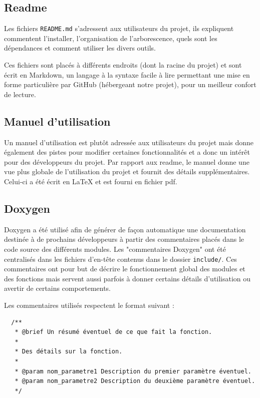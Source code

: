 \documentclass[a4paper,12pt]{article}
\begin{document}
\subsection{Readme}

Les fichiers \verb!README.md! s'adressent aux utilisateurs du projet, ils
expliquent commentent l'installer, l'organisation de l'arborescence, quels
sont les dépendances et comment utiliser les divers outils.

Ces fichiers sont placés à différents endroits (dont la racine du projet) et
sont écrit en Markdown, un langage à la syntaxe facile à lire permettant
une mise en forme particulière par GitHub (hébergeant notre projet), pour un
meilleur confort de lecture.

\subsection{Manuel d'utilisation}

Un manuel d'utilisation est plutôt adressée aux utilisateurs du projet mais
donne également des pistes pour modifier certaines fonctionnalités et a donc
un intérêt pour des développeurs du projet.
Par rapport aux readme, le manuel donne une vue plus globale de l'utilisation
du projet et fournit des détails supplémentaires. Celui-ci a été écrit en
\LaTeX{} et est fourni en fichier pdf.

\subsection{Doxygen}

Doxygen a été utilisé afin de générer de façon automatique une documentation
destinée à de prochains développeurs à partir des commentaires placés dans le
code source des différents modules. Les "commentaires Doxygen" ont été
centralisés dans les fichiers d'en-tête contenus dans le dossier
\verb!include/!. Ces commentaires ont pour but de décrire le fonctionnement
global des modules et des fonctions mais servent aussi parfois à donner
certains détails d'utilisation ou avertir de certains comportements.

Les commentaires utilisés respectent le format suivant :
\begin{verbatim}
  /**
   * @brief Un résumé éventuel de ce que fait la fonction.
   *
   * Des détails sur la fonction.
   *
   * @param nom_parametre1 Description du premier paramètre éventuel.
   * @param nom_parametre2 Description du deuxième paramètre éventuel.
   */
\end{verbatim}
\end{document}
